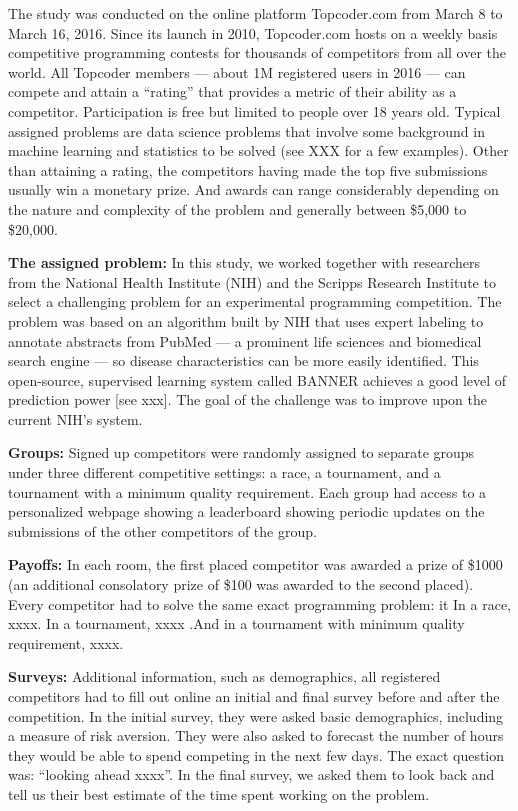 \documentclass[12pt, titlepage, draft]{article} \usepackage[utf8]{inputenc}                           \usepackage[english]{babel}                           \usepackage{amsmath,amssymb,amsfonts}                 \usepackage{xcolor,tikz,graphicx,subfig}              \usepackage{rotating,multirow,array,dcolumn,booktabs} \usepackage{natbib}                                   
\begin{document}
The study was conducted on the online platform Topcoder.com from March 8
to March 16, 2016. Since its launch in 2010, Topcoder.com hosts on a
weekly basis competitive programming contests for thousands of
competitors from all over the world. All Topcoder members --- about 1M
registered users in 2016 --- can compete and attain a ``rating'' that
provides a metric of their ability as a competitor. Participation is
free but limited to people over 18 years old. Typical assigned problems
are data science problems that involve some background in machine
learning and statistics to be solved (see XXX for a few examples). Other
than attaining a rating, the competitors having made the top five
submissions usually win a monetary prize. And awards can range
considerably depending on the nature and complexity of the problem and
generally between \$5,000 to \$20,000.

\textbf{The assigned problem:} In this study, we worked together with
researchers from the National Health Institute (NIH) and the Scripps
Research Institute to select a challenging problem for an experimental
programming competition. The problem was based on an algorithm built by
NIH that uses expert labeling to annotate abstracts from PubMed --- a
prominent life sciences and biomedical search engine --- so disease
characteristics can be more easily identified. This open-source,
supervised learning system called BANNER achieves a good level of
prediction power {[}see xxx{]}. The goal of the challenge was to improve
upon the current NIH's system.

\textbf{Groups:} Signed up competitors were randomly assigned to
separate groups under three different competitive settings: a race, a
tournament, and a tournament with a minimum quality requirement. Each
group had access to a personalized webpage showing a leaderboard showing
periodic updates on the submissions of the other competitors of the
group.

\textbf{Payoffs:} In each room, the first placed competitor was awarded
a prize of \$1000 (an additional consolatory prize of \$100 was awarded
to the second placed). Every competitor had to solve the same exact
programming problem: it In a race, xxxx. In a tournament, xxxx .And in a
tournament with minimum quality requirement, xxxx.

\textbf{Surveys:} Additional information, such as demographics, all
registered competitors had to fill out online an initial and final
survey before and after the competition. In the initial survey, they
were asked basic demographics, including a measure of risk aversion.
They were also asked to forecast the number of hours they would be able
to spend competing in the next few days. The exact question was:
``looking ahead xxxx''. In the final survey, we asked them to look back
and tell us their best estimate of the time spent working on the
problem.
\end{document}
